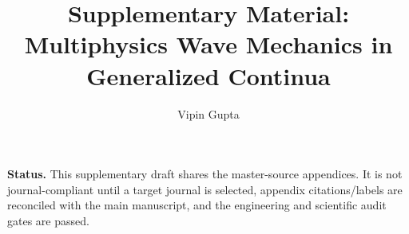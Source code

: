 \documentclass[11pt]{article}
\title{Supplementary Material: Multiphysics Wave Mechanics in Generalized Continua}
\author{Vipin Gupta}
\date{}
\begin{document}
\maketitle
\noindent\textbf{Status.} This supplementary draft shares the master-source appendices. It is not journal-compliant until a target journal is selected, appendix citations/labels are reconciled with the main manuscript, and the engineering and scientific audit gates are passed.
\appendix








\end{document}
